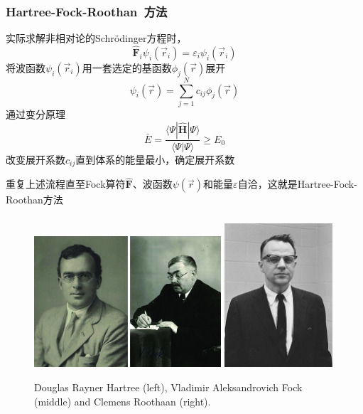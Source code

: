 \frame
{
	\frametitle{\textrm{Hartree-Fock-Roothan~}方法}
	实际求解非相对论的\textrm{Schr\"odinger}方程时，
	$$\hat{\mathbf F}_i\psi_i(\vec r_i)=\varepsilon_i\psi_i(\vec r_i)$$
	将波函数$\psi_i(\vec r_i)$用一套选定的基函数$\phi_j(\vec r)$展开
	$$\psi_i(\vec r)=\sum_{j=1}^Nc_{ij}\phi_j(\vec r)$$
	通过变分原理
	$$\bar E=\dfrac{\langle\Psi|\hat{\mathbf H}|\Psi\rangle}{\langle\Psi|\Psi\rangle}\geqslant E_0$$
	改变展开系数$c_{ij}$直到体系的能量最小，确定展开系数

	重复上述流程直至\textrm{Fock}算符$\hat{\mathbf F}$、波函数$\psi(\vec r)$和能量$\varepsilon$自洽，这就是\textrm{Hartree-Fock-Roothan}方法
}

\frame
{
	\frametitle{}
\begin{figure}[h!]
\centering
\includegraphics[height=0.45\textwidth,width=0.62\textwidth,viewport=0 0 42 30,clip]{Figures/Hartree_Fock.jpg}
\includegraphics[height=0.45\textwidth,width=0.36\textwidth,viewport=0 0 250 305,clip]{Figures/Clemens_Roothaan.jpg}
\caption{\tiny\textrm{Douglas Rayner Hartree (left), Vladimir Aleksandrovich Fock (middle) and Clemens Roothaan (right).}}
\label{HF}
\end{figure}
}

